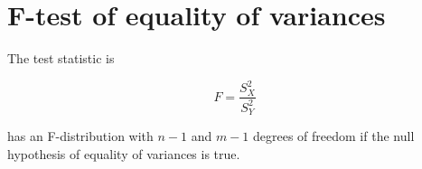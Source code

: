 \documentclass[]{report}
\begin{document}
\section{F-test of equality of variances}
The test statistic is

\begin{equation} 
F = \frac{S_X^2}{S_Y^2}
\end{equation}

has an F-distribution with $n-1$ and $m-1$ degrees of freedom if the null hypothesis of equality of variances is true.
\end{document}
